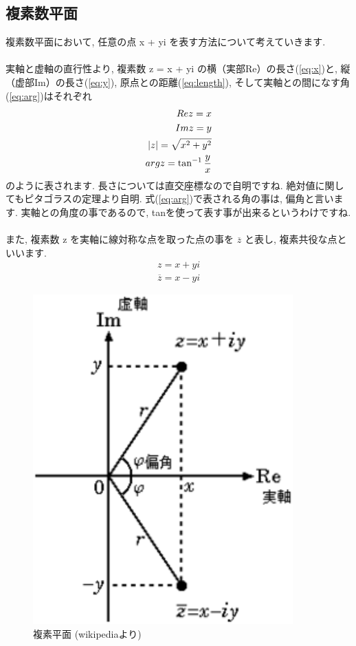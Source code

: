 \documentclass[11pt,a4paper]{jreport}
\begin{document}
\subsection{複素数平面}
複素数平面において, 任意の点 x + yi を表す方法について考えていきます. \\
\\
実軸と虚軸の直行性より, 複素数 z = x + yi の横（実部Re）の長さ(\ref{eq:x})と, 縦（虚部Im）の長さ(\ref{eq:y}), 原点との距離(\ref{eq:length}), そして実軸との間になす角(\ref{eq:arg})はそれぞれ
\begin{eqnarray}
\mathstrut Re z = x
\label{eq:x}
\\
\mathstrut Im z = y
\label{eq:y}
\\
|z| = \sqrt{x^2 + y^2}
\label{eq:length}\\
\mathstrut arg z = \tan^{-1} \frac{y}{x}
\label{eq:arg}
\end{eqnarray}
のように表されます. 長さについては直交座標なので自明ですね. 絶対値に関してもピタゴラスの定理より自明. 式(\ref{eq:arg})で表される角の事は, 偏角と言います. 実軸との角度の事であるので, tanを使って表す事が出来るというわけですね.\\
\\
また, 複素数 z を実軸に線対称な点を取った点の事を $ \overline{z}$ と表し, 複素共役な点といいます.\\

\begin{eqnarray}
z = x + yi
\end{eqnarray}
\begin{eqnarray}
\overline{z} = x - yi
\end{eqnarray}

\begin{figure}[H]
\label{im:complex}
  \centering
  \includegraphics[width=100mm,bb=0 0 220 279]{figures/Complex.png}
  \caption{複素平面 (wikipediaより)}
\end{figure}
\end{document}
